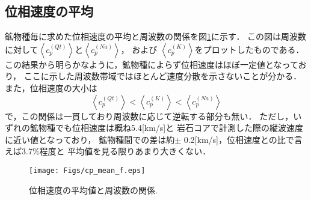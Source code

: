 \subsection{位相速度の平均}
鉱物種毎に求めた位相速度の平均と周波数の関係を図\ref{fig:fig9}に示す．
この図は周波数に対して$\left< c_p^{(Qt)}\right>$と$\left< c_p^{(Na)}\right>$，
および $\left< c_p^{(K)}\right>$をプロットしたものである．
この結果から明らかなように，鉱物種によらず位相速度はほぼ一定値となっており，
ここに示した周波数帯域ではほとんど速度分散を示さないことが分かる．
また，位相速度の大小は
\begin{equation}
	\left< c_p^{(Qt)} \right> 
	< 
	\left< c_p^{(K)} \right> 
	< 
	\left< c_p^{(Na)}\right>
	\label{eqn:}
\end{equation}
で，この関係は一貫しており周波数に応じて逆転する部分も無い．
ただし，いずれの鉱物種でも位相速度は概ね5.4[km/s]と
岩石コアで計測した際の縦波速度に近い値となっており，
鉱物種間での差は約$\pm$ 0.2[km/s]，位相速度との比で言えば3.7$\%$程度と
平均値を見る限りあまり大きくない．
\begin{figure}
\begin{center}
	\texttt{[image: Figs/cp\_mean\_f.eps]}
	\caption{位相速度の平均値と周波数の関係.}
	\label{fig:fig9}
\end{center}
	\vspace{-10mm}
\end{figure}
%
%
